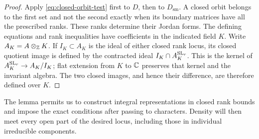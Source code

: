 \begin{proof}
Apply \eqref{eq:closed-orbit-test} first to $D$, then to
$D_{\mathrm{sm}}$. A closed orbit belongs to the first set and not the
second exactly when its boundary matrices have all the prescribed
ranks. These ranks determine their Jordan forms. The defining
equations and rank inequalities have coefficients in the indicated
field $K$.  Write $A_K=A\otimes_{\mathbb Z}K$.  If $I_K\subset A_K$ is
the ideal of either closed rank locus, its closed quotient image is defined by the
contracted ideal $I_K\cap A_K^{\operatorname{SL}_r}$.  This is the kernel of
$A_K^{\operatorname{SL}_r}\to A_K/I_K$; flat extension from $K$ to $\mathbb C$ preserves
that kernel and the invariant algebra.  The two closed images, and
hence their difference, are therefore defined over $K$.
\end{proof}

The lemma permits us to construct integral representations in closed
rank bounds and impose the exact conditions after passing to characters.
Density will then meet every open part of the desired locus, including
those in individual irreducible components.
